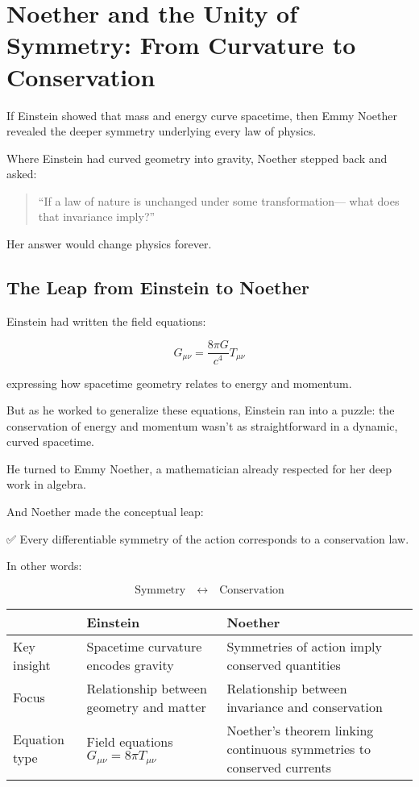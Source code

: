 \section{Noether and the Unity of Symmetry: From Curvature to Conservation}

If Einstein showed that mass and energy curve spacetime,  
then Emmy Noether revealed the deeper symmetry underlying every law of physics.

Where Einstein had curved geometry into gravity,  
Noether stepped back and asked:

\begin{quote}
“If a law of nature is unchanged under some transformation—  
what does that invariance imply?”
\end{quote}

Her answer would change physics forever.

\bigskip

\subsection*{The Leap from Einstein to Noether}

Einstein had written the field equations:

\[
G_{\mu\nu} = \frac{8\pi G}{c^4} T_{\mu\nu}
\]

expressing how spacetime geometry relates to energy and momentum.

But as he worked to generalize these equations,  
Einstein ran into a puzzle: the conservation of energy and momentum wasn’t as straightforward in a dynamic, curved spacetime.

He turned to Emmy Noether, a mathematician already respected for her deep work in algebra.

And Noether made the conceptual leap:

✅ Every differentiable symmetry of the action corresponds to a conservation law.

In other words:

\[
\boxed{\text{Symmetry} \quad \longleftrightarrow \quad \text{Conservation}}
\]

\bigskip

\begin{tcolorbox}[colback=gray!5!white, colframe=black, title=\textbf{Sidebar: The Shift from Einstein to Noether}, fonttitle=\bfseries, arc=1.5mm, boxrule=0.4pt]

\begin{tabular}{>{\raggedright}p{4cm} >{\raggedright}p{5.5cm} >{\raggedright\arraybackslash}p{5.5cm}}
 & \textbf{Einstein} & \textbf{Noether} \\
\midrule
Key insight & Spacetime curvature encodes gravity & Symmetries of action imply conserved quantities \\
Focus & Relationship between geometry and matter & Relationship between invariance and conservation \\
Equation type & Field equations \( G_{\mu\nu} = 8\pi T_{\mu\nu} \) & Noether's theorem linking continuous symmetries to conserved currents
\end{tabular}

\end{tcolorbox}


